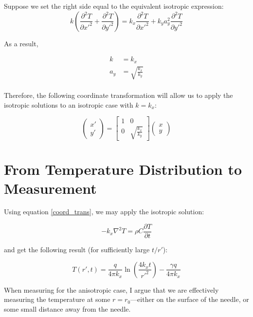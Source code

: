 Suppose we set the right side equal to the equivalent isotropic expression:
\begin{equation*}
k\left(\frac{\partial^2 T}{\partial {x'}^2} + \frac{\partial^2 T}{\partial {y'}^2} \right) = k_x\frac{\partial^2 T}{\partial {x'}^2} + k_ya_y^2\frac{\partial^2 T}{\partial {y'}^2}
\end{equation*}

As a result,

\begin{align*}
k &= k_x\\ a_y &= \sqrt{\frac{k_x}{k_y}}\\
\end{align*}

Therefore, the following coordinate transformation will allow us to apply the
isotropic solutions to an isotropic case with \(k = k_x\):

\begin{equation}
    \label{coord_trans}
    \begin{pmatrix}x' \\ y'\end{pmatrix} =
    \begin{bmatrix}1 & 0\\ 0 & \sqrt{\frac{k_x}{k_y}} \end{bmatrix}\begin{pmatrix}x \\ y\end{pmatrix}
\end{equation}

\section{From Temperature Distribution to Measurement}
\label{sec:analytical-np:isotropic}

Using equation \ref{coord_trans}, we may apply the isotropic solution:

\begin{equation}
    -k_x \nabla^2 T = \rho C\frac{\partial T}{\partial t}
\end{equation}

and get the following result (for sufficiently large \(t/r'\)):

\begin{equation}
T(r',t) = \frac{q}{4\pi k_x}\ln\left(\frac{4k_xt}{r'^2}\right) - \frac{\gamma q}{4\pi k_x}
\end{equation}

When measuring for the anisotropic case, I argue that we are effectively measuring the temperature at some \(r = r_{\textrm{0}}\)---either on the surface of the needle, or some small distance away from the needle.

